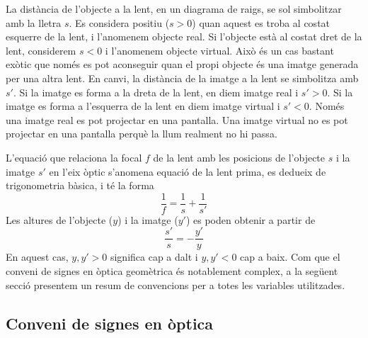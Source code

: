 \documentclass[12pt]{book}
\begin{document}
La distància de l'objecte a la lent, en un diagrama de raigs, se sol simbolitzar amb la lletra $s$. Es considera positiu ($s > 0$) quan aquest es troba al costat esquerre de la lent, i l'anomenem objecte real. Si l'objecte està al costat dret de la lent, considerem $s < 0$ i l'anomenem objecte virtual. Això és un cas bastant exòtic que només es pot aconseguir quan el propi objecte és una imatge generada per una altra lent. En canvi, la distància de la imatge a la lent se simbolitza amb $s'$. Si la imatge es forma a la dreta de la lent, en diem imatge real i $s' > 0$. Si la imatge es forma a l'esquerra de la lent en diem imatge virtual i $s' < 0$. Només una imatge real es pot projectar en una pantalla. Una imatge virtual no es pot projectar en una pantalla perquè la llum realment no hi passa. 

L'equació que relaciona la focal $f$ de la lent amb les posicions de l'objecte $s$ i la imatge $s'$ en l'eix òptic s'anomena equació de la lent prima, es dedueix de trigonometria bàsica, i té la forma
%
\begin{equation}
    \boxed{\frac{1}{f} = \frac{1}{s} + \frac{1}{s'}}
    \label{eqn:lent_prima}
\end{equation}
%
Les altures de l'objecte ($y$) i la imatge ($y'$) es poden obtenir a partir de
%
\begin{equation}
    \boxed{\frac{s'}{s} = - \frac{y'}{y}}
\end{equation}
%
En aquest cas, $y, y' > 0$ significa cap a dalt i $y, y' < 0$ cap a baix. Com que el conveni de signes en òptica geomètrica és notablement complex, a la següent secció presentem un resum de convencions per a totes les variables utilitzades.

\subsection{Conveni de signes en òptica}
\end{document}
